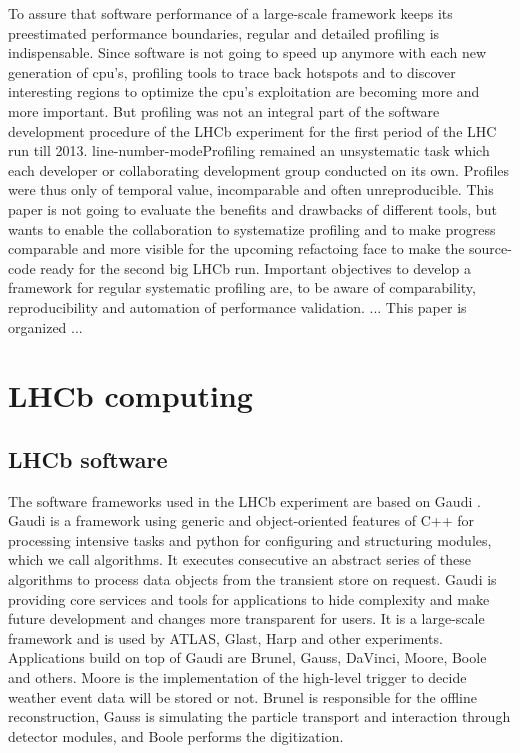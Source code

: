 \documentclass[a4paper]{jpconf}
\begin{document}
To assure that software performance of a large-scale framework keeps its preestimated performance boundaries, regular and detailed profiling is indispensable. Since software is not going to speed up anymore with each new generation of cpu's, profiling tools to trace back hotspots and to discover interesting regions to optimize the cpu's exploitation are becoming more and more important. But profiling was not an integral part of the software development procedure of the LHCb experiment for the first period of the LHC run till 2013. line-number-modeProfiling remained an unsystematic task which each developer or collaborating development group conducted on its own. Profiles were thus only of temporal value, incomparable and often unreproducible. This paper is not going to evaluate the benefits and drawbacks of different tools, but wants to enable the collaboration to systematize profiling and to make progress comparable and more visible for the upcoming refactoing face to make the source-code ready for the second big LHCb run.
\newline
Important objectives to develop a framework for regular systematic profiling are, to be aware of comparability, reproducibility and automation of performance validation. ...
\newline
This paper is organized ...

\section{LHCb computing}
\label{sec:lhcb_computing}



\subsection{LHCb software}
\label{sec:lhcb_software}

The software frameworks used in the LHCb experiment are based on Gaudi \cite{gaudi}. Gaudi is a framework using generic and object-oriented features of C++ for processing intensive tasks and python for configuring and structuring modules, which we call algorithms. It executes consecutive an abstract series of these algorithms to process data objects from the transient store on request. Gaudi is providing core services and tools for applications to hide complexity and make future development and changes more transparent for users. It is a large-scale framework and is used by ATLAS, Glast, Harp and other experiments.
\newline
Applications build on top of Gaudi are Brunel, Gauss, DaVinci, Moore, Boole and others. Moore is the implementation of the high-level trigger to decide weather event data will be stored or not. Brunel is responsible for the offline reconstruction, Gauss is simulating the particle transport and interaction through detector modules, and Boole performs the digitization.
\end{document}
